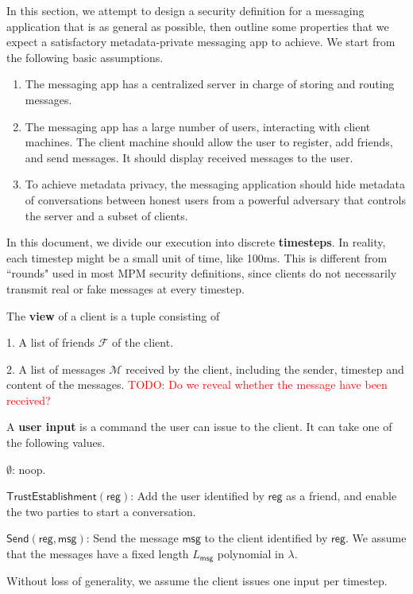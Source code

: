 \documentclass[sigconf, nonacm, balance=false, natbib=false, screen]{acmart}
\newcommand\todo[1]{\textcolor{red}{TODO: #1}}
\newcommand{\msg}{\mathsf{msg}}
\newcommand{\reg}{\mathsf{reg}}
\newcommand{\cF}{\mathcal{F}}
\newcommand{\cM}{\mathcal{M}}
\newcommand{\trust}{\mathsf{TrustEstablishment}}
\newcommand{\send}{\mathsf{Send}}
\begin{document}
In this section, we attempt to design a security definition for a messaging application that is as general as possible, then outline some properties that we expect a satisfactory metadata-private messaging app to achieve. We start from the following basic assumptions.
\begin{enumerate}
    \item The messaging app has a centralized server in charge of storing and routing messages.
    \item The messaging app has a large number of users, interacting with client machines. The client machine should allow the user to register, add friends, and send messages. It should display received messages to the user.
    \item To achieve metadata privacy, the messaging application should hide metadata of conversations between honest users from a powerful adversary that controls the server and a subset of clients. 
\end{enumerate}
\begin{definition}
In this document, we divide our execution into discrete \textbf{timesteps}. In reality, each timestep might be a small unit of time, like 100ms. This is different from ``rounds" used in most MPM security definitions, since clients do not necessarily transmit real or fake messages at every timestep.
\end{definition}
\begin{definition}
The \textbf{view} of a client is a tuple consisting of

1. A list of friends $\cF$ of the client.

2. A list of messages $\cM$ received by the client, including the sender, timestep and content of the messages. \todo{Do we reveal whether the message have been received?}
\end{definition}
\begin{definition}
A \textbf{user input} is a command the user can issue to the client. It can take one of the following values.

$\emptyset$: noop.

$\trust(\reg)$: Add the user identified by $\reg$ as a friend, and enable the two parties to start a conversation.

$\send(\reg, \msg)$: Send the message $\msg$ to the client identified by $\reg$. We assume that the messages have a fixed length $L_{\msg}$ polynomial in $\lambda$.

Without loss of generality, we assume the client issues one input per timestep.
\end{definition}
\end{document}
